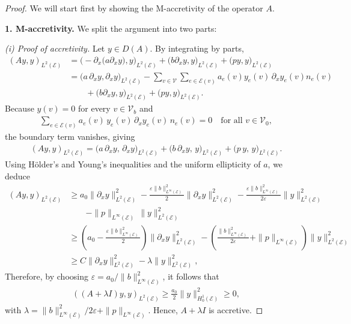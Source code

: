 \documentclass[a4paper, 10pt, english]{article}
\begin{document}
\begin{proof}
We will start first by showing the M-accretivity of the operator $A$.
\smallbreak

\noindent
\textbf{1. M-accretivity.}
We split the argument into two parts: 

\smallbreak
\textit{(i) Proof of accretivity.} Let $y \in D(A)$. By integrating by parts,
\begin{align*}
(Ay,y)_{L^2(\mathcal{E})} 
&= 
\bigl(-\partial_x\bigl(a\partial_x y\bigr),y\bigr)_{L^2(\mathcal{E})}
+\bigl(b\partial_x y,y\bigr)_{L^2(\mathcal{E})}
+\bigl(py,y\bigr)_{L^2(\mathcal{E})}
\\
&= 
\bigl(a\,\partial_x y,\partial_x y\bigr)_{L^2(\mathcal{E})}
-
\sum_{v \in \mathcal{V}}\sum_{e \in \mathcal{E}(v)}
a_e(v)y_e(v)\,\partial_x y_e(v)n_e(v)\\
&\qquad+\bigl(b\partial_x y,y\bigr)_{L^2(\mathcal{E})}+\bigl(py,y\bigr)_{L^2(\mathcal{E})}.
\end{align*}
Because $y(v)=0$ for every $v \in \mathcal{V}_b$ and 
\begin{align*}
\sum_{e \in \mathcal{E}(v)} a_e(v)\,y_e(v)\,\partial_x y_e(v)\,n_e(v) 
= 0
\quad 
\text{for all } v \in \mathcal{V}_0,
\end{align*}
the boundary term vanishes, giving
\begin{align*}
(Ay,y)_{L^2(\mathcal{E})}
=
\bigl(a\,\partial_x y,\,\partial_x y\bigr)_{L^2(\mathcal{E})}
+\bigl(b\,\partial_x y,\,y\bigr)_{L^2(\mathcal{E})}
+\bigl(p\,y,\,y\bigr)_{L^2(\mathcal{E})}.
\end{align*}
Using Hölder’s and Young’s inequalities and the uniform ellipticity of $a$, we deduce
\begin{align*}
(Ay,y)_{L^2(\mathcal{E})}
&\geq 
a_0\|\partial_x y\|_{L^2(\mathcal{E})}^2
-
\frac{\varepsilon\|b\|_{L^\infty(\mathcal{E})}^2}{2}\|\partial_x y\|_{L^2(\mathcal{E})}^2-\frac{\varepsilon\|b\|_{L^\infty(\mathcal{E})}^2}{2\varepsilon}\|y\|_{L^2(\mathcal{E})}^2\\
&\qquad
-
\|p\|_{L^\infty(\mathcal{E})}\,\|y\|_{L^2(\mathcal{E})}^2\\
&\geq \left(a_0-\frac{\varepsilon\|b\|_{L^\infty(\mathcal{E})}^2}{2}\right)\|\partial_x y\|_{L^2(\mathcal{E})}^2 - \left(\frac{\|b\|_{L^\infty(\mathcal{E})}^2}{2\varepsilon}+\|p\|_{L^\infty(\mathcal{E})}\right)\|y\|_{L^2(\mathcal{E})}^2\\
&\geq C\|\partial_x y\|_{L^2(\mathcal{E})}^2 -\lambda\|y\|_{L^2(\mathcal{E})}^2, 
\end{align*}
Therefore, by choosing $\varepsilon = a_0/\|b\|_{L^\infty(\mathcal{E})}^2$, it follows that
\begin{align}\label{eq:momotonicity}
    ((A+\lambda I )y,y)_{L^2(\mathcal{E})}\geq \frac{a_0}{2}\| y\|_{H_0^1(\mathcal{E})}^2\geq 0,
\end{align}
with $\lambda = \|b\|_{L^\infty(\mathcal{E})}^2/2\varepsilon+\|p\|_{L^\infty(\mathcal{E})}$. Hence, $A +\lambda I$ is accretive.


\end{proof}
\end{document}
